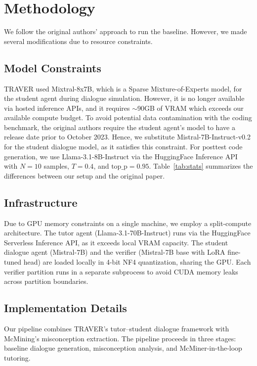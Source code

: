 \documentclass[11pt]{article}
\begin{document}
\section{Methodology}

We follow the original authors' approach to run the baseline. However, we made several modifications due to resource constraints.
\subsection{Model Constraints}
TRAVER used Mixtral-8x7B, which is a Sparse Mixture-of-Experts model, for the student agent during dialogue simulation. However, it is no longer available via hosted inference APIs, and it requires $\sim$90GB of VRAM which exceeds our available compute budget. To avoid potential data contamination with the coding benchmark, the original authors require the student agent's model to have a release date prior to October 2023. Hence, we substitute Mistral-7B-Instruct-v0.2 for the student dialogue model, as it satisfies this constraint. For posttest code generation, we use Llama-3.1-8B-Instruct via the HuggingFace Inference API with $N{=}10$ samples, $T{=}0.4$, and $\text{top\_p}{=}0.95$. Table~\ref{tab:stats} summarizes the differences between our setup and the original paper.


\subsection{Infrastructure}
Due to GPU memory constraints on a single machine, we employ a split-compute architecture. The tutor agent (Llama-3.1-70B-Instruct) runs via the HuggingFace Serverless Inference API, as it exceeds local VRAM capacity. The student dialogue agent (Mistral-7B) and the verifier (Mistral-7B base with LoRA fine-tuned head) are loaded locally in 4-bit NF4 quantization, sharing the GPU. Each verifier partition runs in a separate subprocess to avoid CUDA memory leaks across partition boundaries.

\subsection{Implementation Details}
Our pipeline combines TRAVER's tutor–student dialogue framework with McMining's misconception extraction. The pipeline proceeds in three stages: baseline dialogue generation, misconception analysis, and McMiner-in-the-loop tutoring.
\end{document}

